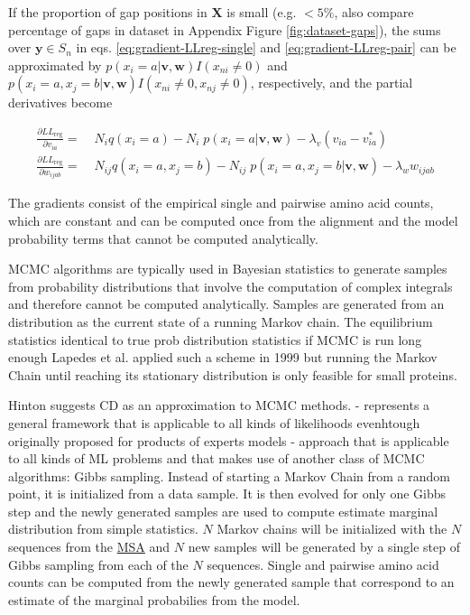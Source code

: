 \documentclass[12pt,a4paper,twoside]{book}
\newcommand{\eq}{\!=\!}
\newcommand{\LLreg}{L\!L_\mathrm{reg}}
\newcommand{\Sn}{S_n}
\renewcommand{\v}{\mathbf{v}}
\newcommand{\via}{v_{ia}}
\newcommand{\w}{\mathbf{w}}
\newcommand{\wijab}{w_{ijab}}
\newcommand{\X}{\mathbf{X}}
\theoremstyle{definition}
\theoremstyle{definition}
\theoremstyle{remark}
\begin{document}
If the proportion of gap positions in \(\X\) is small (e.g. \(<5\%\),
also compare percentage of gaps in dataset in Appendix Figure
\ref{fig:dataset-gaps}), the sums over \(\mathbf{y} \in \Sn\) in eqs.
\eqref{eq:gradient-LLreg-single} and \eqref{eq:gradient-LLreg-pair} can be
approximated by \(p(x_i=a | \v,\w) I(x_{ni} \ne 0)\) and
\(p(x_i=a, x_j=b | \v,\w) I(x_{ni} \ne 0, x_{nj} \ne 0)\), respectively,
and the partial derivatives become

\begin{align}
  \frac{\partial \LLreg}{\partial \via}   =& \; N_i q(x_i \eq a) -  N_i \; p(x_i \eq a  | \v,\w)  - \lambda_v (\via - \via^*)  \\
  \frac{\partial \LLreg}{\partial \wijab} =& \; N_{ij} q(x_i \eq a, x_j=b) - N_{ij} \; p(x_i \eq a, x_j \eq b | \v,\w) - \lambda_w \wijab
  \label{eq:gradient-LLreg-approx}
\end{align}

The gradients consist of the empirical single and pairwise amino acid
counts, which are constant and can be computed once from the alignment
and the model probability terms that cannot be computed analytically.

MCMC algorithms are typically used in Bayesian statistics to generate
samples from probability distributions that involve the computation of
complex integrals and therefore cannot be computed analytically. Samples
are generated from an distribution as the current state of a running
Markov chain. The equilibrium statistics identical to true prob
distribution statistics if MCMC is run long enough Lapedes et al.
applied such a scheme in 1999 but running the Markov Chain until
reaching its stationary distribution is only feasible for small
proteins.

Hinton suggests CD as an approximation to MCMC methods. - represents a
general framework that is applicable to all kinds of likelihoods
evenhtough originally proposed for products of experts models - approach
that is applicable to all kinds of ML problems and that makes use of
another class of MCMC algorithms: Gibbs sampling. Instead of starting a
Markov Chain from a random point, it is initialized from a data sample.
It is then evolved for only one Gibbs step and the newly generated
samples are used to compute estimate marginal distribution from simple
statistics. \(N\) Markov chains will be initialized with the \(N\)
sequences from the \protect\hyperlink{abbrev}{MSA} and \(N\) new samples
will be generated by a single step of Gibbs sampling from each of the
\(N\) sequences. Single and pairwise amino acid counts can be computed
from the newly generated sample that correspond to an estimate of the
marginal probabilies from the model.
\end{document}
